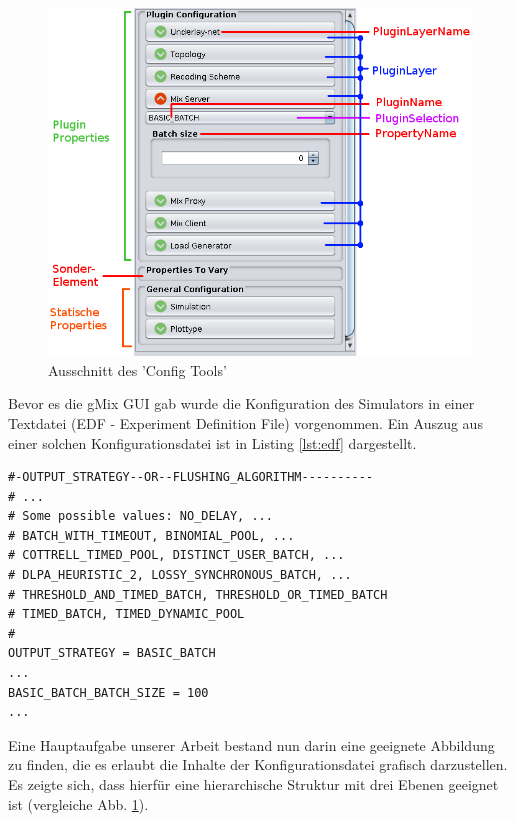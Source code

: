 \documentclass[a4paper, 11pt]{article} %
\begin{document}
\begin{figure}[!htp]

\includegraphics[scale=0.56]{img/configtool_edit.png}

\caption{Ausschnitt des 'Config Tools'}
\label{fig:guielements}
\end{figure}

Bevor es die gMix GUI gab wurde die Konfiguration des Simulators in einer Textdatei (EDF - Experiment Definition File) vorgenommen. Ein Auszug aus einer solchen Konfigurationsdatei ist in Listing \ref{lst:edf} dargestellt. 

\newpage

\begin{lstlisting}[caption={Auszug aus einer Simulator Konfiguration},label=lst:edf,frame=lrtb]
#-OUTPUT_STRATEGY--OR--FLUSHING_ALGORITHM----------
# ...
# Some possible values: NO_DELAY, ... 
# BATCH_WITH_TIMEOUT, BINOMIAL_POOL, ... 
# COTTRELL_TIMED_POOL, DISTINCT_USER_BATCH, ... 
# DLPA_HEURISTIC_2, LOSSY_SYNCHRONOUS_BATCH, ...
# THRESHOLD_AND_TIMED_BATCH, THRESHOLD_OR_TIMED_BATCH 
# TIMED_BATCH, TIMED_DYNAMIC_POOL
#	
OUTPUT_STRATEGY = BASIC_BATCH
...
BASIC_BATCH_BATCH_SIZE = 100
...
\end{lstlisting}

Eine Hauptaufgabe unserer Arbeit bestand nun darin eine geeignete Abbildung zu finden, die es erlaubt die Inhalte der Konfigurationsdatei grafisch darzustellen. Es zeigte sich, dass hierfür eine hierarchische Struktur mit drei Ebenen geeignet ist (vergleiche Abb. \ref{fig:guielements}).
\end{document}
